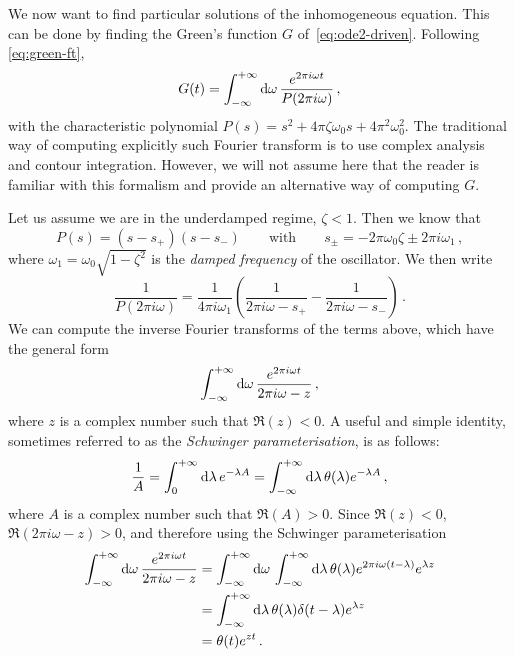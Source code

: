 We now want to find particular solutions of the inhomogeneous equation. This can be
done by finding the Green's function $G$ of~\cref{eq:ode2-driven}. Following
\cref{eq:green-ft},
\begin{equation}
  G(t)=\int_{-\infty}^{+\infty}\mathrm{d}{\omega}\,\frac{e^{2\pi i\omega t}}{P(2\pi i\omega)}\,,
\end{equation}
with the characteristic polynomial $P(s)=s^2+4\pi\zeta\omega_0s+4\pi^2\omega_0^2$. The
traditional way of computing explicitly such Fourier transform is to use complex analysis
and contour integration. However, we will not assume here that the reader is familiar with
this formalism and provide an alternative way of computing $G$.

Let us assume we are in the underdamped regime, \ie $\zeta<1$. Then we know that
\begin{equation}
  P(s)=(s-s_+)(s-s_-)\qquad\text{with}\qquad
  s_\pm=-2\pi\omega_0\zeta\pm 2\pi i\omega_1\,,
\end{equation}
where $\omega_1=\omega_0\sqrt{1-\zeta^2}$ is the \emph{damped frequency} of the
oscillator. We then write
\begin{equation}
  \frac{1}{P(2\pi i\omega)}=\frac{1}{4\pi i\omega_1}\left(\frac{1}{2\pi i\omega-s_+}
  -\frac{1}{2\pi i\omega-s_-}\right)\,.
  \label{eq:p-part-frac}
\end{equation}
We can compute the inverse Fourier transforms of the terms above, which have the general
form
\begin{equation}
  \int_{-\infty}^{+\infty}\mathrm{d}{\omega}\,\frac{e^{2\pi i\omega t}}{2\pi i \omega-z}\,,
\end{equation}
where $z$ is a complex number such that $\Re(z)<0$. A useful and simple identity,
sometimes referred to as the \emph{Schwinger parameterisation}, is as follows:
\begin{equation}
  \frac{1}{A}=\int_0^{+\infty}\mathrm{d}\lambda\,e^{-\lambda A}
  =\int_{-\infty}^{+\infty}\mathrm{d}{\lambda}\,\theta(\lambda)e^{-\lambda A}\,,
\end{equation}
where $A$ is a complex number such that $\Re(A)>0$. Since $\Re(z)<0$, $\Re(2\pi i
\omega-z)>0$, and therefore using the Schwinger parameterisation
\begin{align}
  \int_{-\infty}^{+\infty}\mathrm{d}{\omega}\,\frac{e^{2\pi i\omega t}}{2\pi i \omega-z}&=
  \int_{-\infty}^{+\infty}\mathrm{d}{\omega}\,\int_{-\infty}^{+\infty}\mathrm{d}{\lambda}\,\theta(\lambda)
  e^{2\pi i\omega(t-\lambda)}e^{\lambda z}\notag\\
  &=\int_{-\infty}^{+\infty}\mathrm{d}{\lambda}\,\theta(\lambda)\delta(t-\lambda)e^{\lambda z}\notag\\
  &=\theta(t)e^{zt}\,.
  \label{eq:thetaexp}
\end{align}
